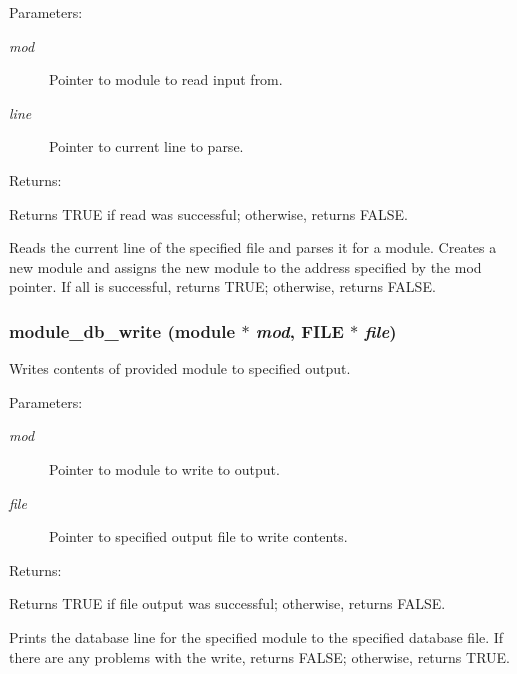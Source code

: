 \begin{Desc}
\item[Parameters: ]\par
\begin{description}
\item[{\em 
mod}]Pointer to module to read input from. \item[{\em 
line}]Pointer to current line to parse. \end{description}
\end{Desc}
\begin{Desc}
\item[Returns: ]\par
Returns TRUE if read was successful; otherwise, returns FALSE.\end{Desc}
Reads the current line of the specified file and parses it for a module. Creates a new module and assigns the new module to the address specified by the mod pointer. If all is successful, returns TRUE; otherwise, returns FALSE. 
\subsubsection{ module\_\-db\_\-write ({\bf module} $\ast$ {\em mod}, FILE $\ast$ {\em file})}\label{module_8h_a3}


Writes contents of provided module to specified output.

\begin{Desc}
\item[Parameters: ]\par
\begin{description}
\item[{\em 
mod}]Pointer to module to write to output. \item[{\em 
file}]Pointer to specified output file to write contents. \end{description}
\end{Desc}
\begin{Desc}
\item[Returns: ]\par
Returns TRUE if file output was successful; otherwise, returns FALSE.\end{Desc}
Prints the database line for the specified module to the specified database file. If there are any problems with the write, returns FALSE; otherwise, returns TRUE. 
